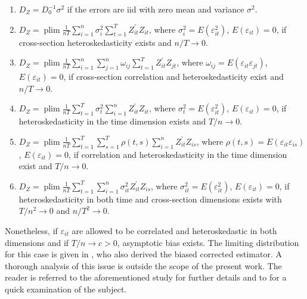 \begin{enumerate}
    \item \(D_Z = D_0^{-1} \sigma^2\) if the errors are \ac{iid} with zero mean and variance \(\sigma^2\).
    \item \(D_Z = \operatorname{plim} \frac{1}{n T} \sum_{i=1}^n \sigma_i^2 \sum_{t=1}^T Z_{i t}^{\prime} Z_{i t}\), where \(\sigma_i^2 = E\left(\varepsilon_{i t}^2\right)\), \(E\left(\varepsilon_{i t}\right) = 0\), if cross-section heteroskedasticity exists and \(n / T \rightarrow 0\).\label{error.type2}
    \item \(D_Z = \operatorname{plim} \frac{1}{n T} \sum_{i=1}^n \sum_{j=1}^n \omega_{i j} \sum_{t=1}^T Z_{i t}^{\prime} Z_{j t}\), where \(\omega_{i j} = E\left(\varepsilon_{i t} \varepsilon_{j t}\right)\), \(E\left(\varepsilon_{i t}\right) = 0\), if cross-section correlation and heteroskedasticity exist and \(n / T \rightarrow 0\).\label{error.type3}
    \item \(D_Z = \operatorname{plim} \frac{1}{n T} \sum_{t=1}^T \sigma_t^2 \sum_{i=1}^n Z_{i t}^{\prime} Z_{i t}\), where \(\sigma_t^2 = E\left(\varepsilon_{i t}^2\right)\), \(E\left(\varepsilon_{i t}\right) = 0\), if heteroskedasticity in the time dimension exists and \(T / n \rightarrow 0\).\label{error.type4}
    \item \(D_Z = \operatorname{plim} \frac{1}{n T} \sum_{t=1}^T \sum_{s=1}^T \rho(t, s) \sum_{i=1}^n Z_{i t}^{\prime} Z_{i s}\), where \(\rho(t, s) = E\left(\varepsilon_{i t} \varepsilon_{i s}\right)\), \(E\left(\varepsilon_{i t}\right) = 0\), if correlation and heteroskedasticity in the time dimension exist and \(T / n \rightarrow 0\).\label{error.type5}
    \item \(D_Z = \operatorname{plim} \frac{1}{n T} \sum_{t=1}^T \sum_{i=1}^n \sigma_{i t}^2 Z_{i t}^{\prime} Z_{i s}\), where \(\sigma_{i t}^2 = E\left(\varepsilon_{i t}^2\right)\), \(E\left(\varepsilon_{i t}\right) = 0\), if heteroskedasticity in both time and cross-section dimensions exists with \(T / n^2 \rightarrow 0\) and \(n / T^2 \rightarrow 0\).\label{error.type6}
\end{enumerate}



Nonetheless, if $\varepsilon_{i t}$ are allowed to be correlated and heteroskedastic in both dimensions and if $T / n \rightarrow c>0$, asymptotic bias exists. The limiting distribution for this case is given in \citet{bai2009panel}, who also derived the biased corrected estimator. A thorough analysis of this issue is outside the scope of the present work. The reader is referred to the aforementioned study for further details and to \citet{bada2012phtt} for a quick examination of the subject. 

